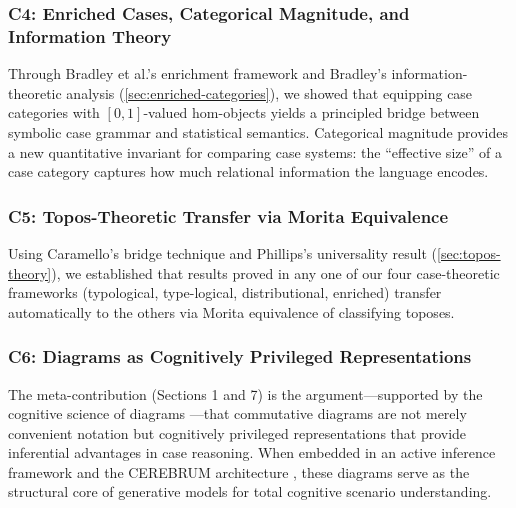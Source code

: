 \documentclass[
]{article}
\numberwithin{equation}{section}
\begin{document}
\subsubsection{C4: Enriched Cases, Categorical Magnitude, and
Information
Theory}\label{c4-enriched-cases-categorical-magnitude-and-information-theory}

Through Bradley et al.'s \citeyearpar{fritz2021enriched} enrichment
framework and Bradley's \citeyearpar{bradley2020entropy}
information-theoretic analysis (\autoref{sec:enriched-categories}), we
showed that equipping case categories with \([0,1]\)-valued hom-objects
yields a principled bridge between symbolic case grammar and statistical
semantics. Categorical magnitude provides a new quantitative invariant
for comparing case systems: the ``effective size'' of a case category
captures how much relational information the language encodes.

\subsubsection{C5: Topos-Theoretic Transfer via Morita
Equivalence}\label{c5-topos-theoretic-transfer-via-morita-equivalence}

Using Caramello's \citeyearpar{caramello2016bridges} bridge technique
and Phillips's \citeyearpar{phillips2024lot} universality result
(\autoref{sec:topos-theory}), we established that results proved in any
one of our four case-theoretic frameworks (typological, type-logical,
distributional, enriched) transfer automatically to the others via
Morita equivalence of classifying toposes.

\subsubsection{C6: Diagrams as Cognitively Privileged
Representations}\label{c6-diagrams-as-cognitively-privileged-representations}

The meta-contribution (Sections 1 and 7) is the argument---supported by
the cognitive science of diagrams
\citep{larkin1987diagram, shimojima1996reasoning, giardino2017diagrammatic, manders2008euclidean}---that
commutative diagrams are not merely convenient notation but cognitively
privileged representations that provide inferential advantages in case
reasoning. When embedded in an active inference framework
\citep{friston2017active} and the CEREBRUM architecture
\citep{friedman2024cerebrum}, these diagrams serve as the structural
core of generative models for total cognitive scenario understanding.
\end{document}
